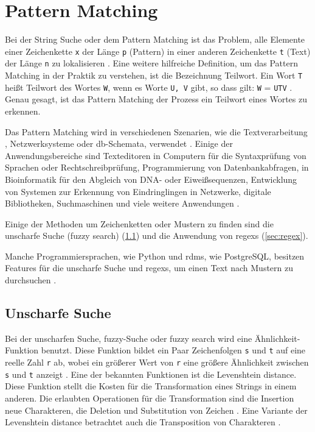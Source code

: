 \section{Pattern Matching} \label{subsec:pattmatch}

Bei der String Suche oder dem Pattern Matching ist das Problem, alle Elemente einer Zeichenkette \texttt{x} der Länge \texttt{p} (Pattern) in einer anderen Zeichenkette \texttt{t} (Text) der Länge \texttt{n} zu lokalisieren \cite{patternmatchingapostolico}. Eine weitere hilfreiche Definition, um das Pattern Matching in der Praktik zu verstehen, ist die Bezeichnung \glqq Teilwort\grqq{}. \glqq Ein Wort \texttt{T} heißt Teilwort des Wortes \texttt{W}, wenn es Worte \texttt{U, V} gibt, so dass gilt: \texttt{W} = \texttt{UTV}\grqq{} \cite{teilwort}. Genau gesagt, ist das Pattern Matching der Prozess ein Teilwort eines Wortes zu erkennen.

Das Pattern Matching wird in verschiedenen Szenarien, wie die Textverarbeitung \cite{patternmatchingeffi}, Netzwerksysteme oder \ac{db}-Schemata, verwendet \cite{patternmatchingapps}. Einige der Anwendungsbereiche sind Texteditoren in Computern für die Syntaxprüfung von Sprachen oder Rechtschreibprüfung, Programmierung von Datenbankabfragen, in Bioinformatik für den Abgleich von DNA- oder Eiweißsequenzen, Entwicklung von Systemen zur Erkennung von Eindringlingen in Netzwerke, digitale Bibliotheken, Suchmaschinen und viele weitere Anwendungen \cite{regexconf, patternmatchingapps}.

Einige der Methoden um Zeichenketten oder Mustern zu finden sind die unscharfe Suche (fuzzy search) (\ref{sub:levdist}) und die Anwendung von \acp{regex} (\ref{sec:regex}).

Manche Programmiersprachen, wie Python und \ac{rdms}, wie PostgreSQL, besitzen Features für die unscharfe Suche und \acp{regex}, um einen Text nach Mustern zu durchsuchen \cite{thefuzzlib, patternmatchingpostgres}.

\subsection{Unscharfe Suche} \label{sub:levdist}

Bei der unscharfen Suche, fuzzy-Suche oder fuzzy search wird eine Ähnlichkeit-Funktion benutzt. Diese Funktion bildet ein Paar Zeichenfolgen \texttt{s} und \texttt{t} auf eine reelle Zahl \texttt{r} ab, wobei ein größerer Wert von \texttt{r} eine größere Ähnlichkeit zwischen \texttt{s} und \texttt{t} anzeigt \cite{stringsearch2}. Eine der bekannten Funktionen ist die \glqq Levenshtein distance\grqq{}. Diese Funktion stellt die Kosten für die Transformation eines Strings in einem anderen. Die erlaubten Operationen für die Transformation sind die Insertion neue Charakteren, die Deletion und Substitution von Zeichen \cite{stringsearch2}. Eine Variante der \glqq Levenshtein distance\grqq{} betrachtet auch die Transposition von Charakteren \cite{thefuzzyalgo}.

